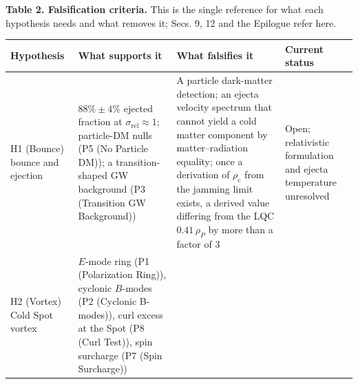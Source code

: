 \documentclass[
]{article}
\begin{document}
\textbf{Table 2. Falsification criteria.} This is the single reference
for what each hypothesis needs and what removes it; Secs. 9, 12 and the
Epilogue refer here.

\begin{longtable}[]{@{}llll@{}}
\toprule
\begin{minipage}[b]{0.22\columnwidth}\raggedright
Hypothesis\strut
\end{minipage} & \begin{minipage}[b]{0.22\columnwidth}\raggedright
What supports it\strut
\end{minipage} & \begin{minipage}[b]{0.22\columnwidth}\raggedright
What falsifies it\strut
\end{minipage} & \begin{minipage}[b]{0.22\columnwidth}\raggedright
Current status\strut
\end{minipage}\tabularnewline
\midrule
\endhead
\begin{minipage}[t]{0.22\columnwidth}\raggedright
H1 (Bounce) bounce and ejection\strut
\end{minipage} & \begin{minipage}[t]{0.22\columnwidth}\raggedright
\(88\% \pm 4\%\) ejected fraction at \(\sigma_{\text{rel}} \approx 1\);
particle-DM nulls (P5 (No Particle DM)); a transition-shaped GW
background (P3 (Transition GW Background))\strut
\end{minipage} & \begin{minipage}[t]{0.22\columnwidth}\raggedright
A particle dark-matter detection; an ejecta velocity spectrum that
cannot yield a cold matter component by matter--radiation equality; once
a derivation of \(\rho_c\) from the jamming limit exists, a derived
value differing from the LQC \(0.41\,\rho_P\) by more than a factor of
\(3\)\strut
\end{minipage} & \begin{minipage}[t]{0.22\columnwidth}\raggedright
Open; relativistic formulation and ejecta temperature unresolved\strut
\end{minipage}\tabularnewline
\begin{minipage}[t]{0.22\columnwidth}\raggedright
H2 (Vortex) Cold Spot vortex\strut
\end{minipage} & \begin{minipage}[t]{0.22\columnwidth}\raggedright
\(E\)-mode ring (P1 (Polarization Ring)), cyclonic \(B\)-modes (P2
(Cyclonic B-modes)), curl excess at the Spot (P8 (Curl Test)), spin
surcharge (P7 (Spin Surcharge))\strut

\end{minipage}
\end{longtable}
\end{document}
